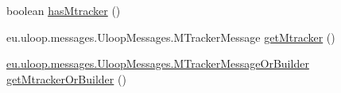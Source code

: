 \begin{DoxyCompactItemize}
\item 
boolean \hyperlink{interfaceeu_1_1uloop_1_1messages_1_1UloopMessages_1_1UloopMessageOrBuilder_a3624829947d38b05a5230feb5cc92a9e}{has\+Mtracker} ()
\item 
eu.\+uloop.\+messages.\+Uloop\+Messages.\+M\+Tracker\+Message \hyperlink{interfaceeu_1_1uloop_1_1messages_1_1UloopMessages_1_1UloopMessageOrBuilder_a53f9bc39fd721b8fd7b1cdd22e76f3e7}{get\+Mtracker} ()
\item 
\hyperlink{interfaceeu_1_1uloop_1_1messages_1_1UloopMessages_1_1MTrackerMessageOrBuilder}{eu.\+uloop.\+messages.\+Uloop\+Messages.\+M\+Tracker\+Message\+Or\+Builder} \hyperlink{interfaceeu_1_1uloop_1_1messages_1_1UloopMessages_1_1UloopMessageOrBuilder_a07420470bdc38be00cddbf74b435b502}{get\+Mtracker\+Or\+Builder} ()
\end{DoxyCompactItemize}


